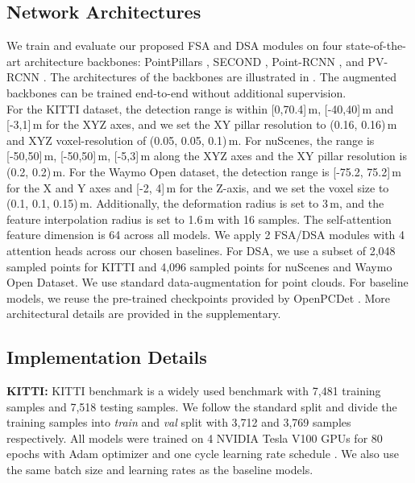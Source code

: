 \documentclass[10pt,twocolumn,letterpaper]{article}
\begin{document}
\subsection{Network Architectures} 
We train and evaluate our proposed FSA and DSA modules on four state-of-the-art architecture backbones: PointPillars \cite{pointpillars}, SECOND \cite{SECOND}, Point-RCNN \cite{PointRCNN}, and PV-RCNN \cite{PVRCNN}. The architectures of the backbones are illustrated in . The augmented backbones can be trained end-to-end without additional supervision. 
\\ For the KITTI dataset, the detection range is within [0,70.4]\,m, [-40,40]\,m and [-3,1]\,m for the XYZ axes, and we set the XY pillar resolution to (0.16, 0.16)\,m and XYZ voxel-resolution of (0.05, 0.05, 0.1)\,m. For nuScenes, the range is [-50,50]\,m, [-50,50]\,m, [-5,3]\,m along the XYZ axes and the XY pillar resolution is (0.2, 0.2)\,m. For the Waymo Open dataset, the detection range is [-75.2, 75.2]\,m for the X and Y axes and [-2, 4]\,m for the Z-axis, and we set the voxel size to (0.1, 0.1, 0.15)\,m. Additionally, the deformation radius is set to 3\,m, and the feature interpolation radius is set to 1.6\,m with 16 samples. The self-attention feature dimension is 64 across all models. We apply 2 FSA/DSA modules with 4 attention heads across our chosen baselines. For DSA, we use a subset of 2,048 sampled points for KITTI and 4,096 sampled points for nuScenes and Waymo Open Dataset. We use standard data-augmentation for point clouds. For baseline models, we reuse the pre-trained checkpoints provided by OpenPCDet \cite{OpenPCDet}. More architectural details are provided in the supplementary.

\subsection{Implementation Details}
\textbf{KITTI:} KITTI benchmark \cite{KITTI} is a widely used benchmark with 7,481 training samples and 7,518 testing samples. We follow the standard split \cite{MV3D} and divide the training samples into \textit{train} and \textit{val} split with 3,712 and 3,769 samples respectively. All models were trained on 4 NVIDIA Tesla V100 GPUs for 80 epochs with Adam optimizer \cite{Adam} and one cycle learning rate schedule \cite{onecycle}.  We also use the same batch size and learning rates as the baseline models. 
\end{document}
